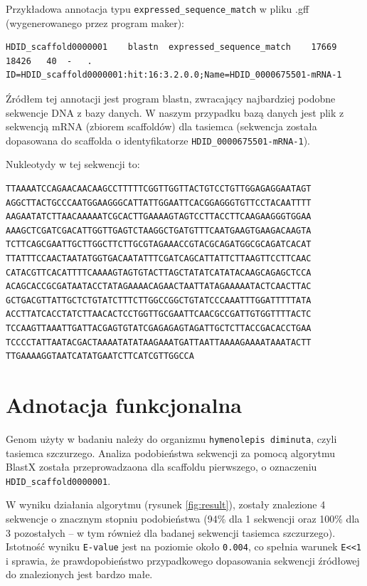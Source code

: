 \documentclass[a4paper]{article}
\begin{document}
Przykładowa annotacja typu \texttt{expressed\_sequence\_match} w pliku .gff (wygenerowanego przez program maker):
\begin{lstlisting}
HDID_scaffold0000001	blastn	expressed_sequence_match	17669	18426	40	-	.	ID=HDID_scaffold0000001:hit:16:3.2.0.0;Name=HDID_0000675501-mRNA-1
\end{lstlisting}

Źródłem tej annotacji jest program blastn, zwracający najbardziej podobne sekwencje DNA z bazy danych.
W naszym przypadku bazą danych jest plik z sekwencją mRNA (zbiorem scaffoldów) dla tasiemca
(sekwencja została dopasowana do scaffolda o identyfikatorze \texttt{HDID\_0000675501-mRNA-1}).


Nukleotydy w tej sekwencji to:

\begin{verbatim}
TTAAAATCCAGAACAACAAGCCTTTTTCGGTTGGTTACTGTCCTGTTGGAGAGGAATAGT
AGGCTTACTGCCCAATGGAAGGGCATTATTGGAATTCACGGAGGGTGTTCCTACAATTTT
AAGAATATCTTAACAAAAATCGCACTTGAAAAGTAGTCCTTACCTTCAAGAAGGGTGGAA
AAAGCTCGATCGACATTGGTTGAGTCTAAGGCTGATGTTTCAATGAAGTGAAGACAAGTA
TCTTCAGCGAATTGCTTGGCTTCTTGCGTAGAAACCGTACGCAGATGGCGCAGATCACAT
TTATTTCCAACTAATATGGTGACAATATTTCGATCAGCATTATTCTTAAGTTCCTTCAAC
CATACGTTCACATTTTCAAAAGTAGTGTACTTAGCTATATCATATACAAGCAGAGCTCCA
ACAGCACCGCGATAATACCTATAGAAAACAGAACTAATTATAGAAAAATACTCAACTTAC
GCTGACGTTATTGCTCTGTATCTTTCTTGGCCGGCTGTATCCCAAATTTGGATTTTTATA
ACCTTATCACCTATCTTAACACTCCTGGTTGCGAATTCAACGCCGATTGTGGTTTTACTC
TCCAAGTTAAATTGATTACGAGTGTATCGAGAGAGTAGATTGCTCTTACCGACACCTGAA
TCCCCTATTAATACGACTAAAATATATAAGAAATGATTAATTAAAAGAAAATAAATACTT
TTGAAAAGGTAATCATATGAATCTTCATCGTTGGCCA
\end{verbatim}


\section{Adnotacja funkcjonalna}
Genom użyty w badaniu należy do organizmu \texttt{hymenolepis diminuta}, czyli tasiemca szczurzego.
Analiza podobieństwa sekwencji za pomocą algorytmu BlastX została przeprowadzaona dla scaffoldu pierwszego,
o oznaczeniu \texttt{HDID\_scaffold0000001}.

W wyniku działania algorytmu (rysunek \ref{fig:result}), zostały znalezione 4 sekwencje o znacznym stopniu podobieństwa
(94\% dla 1 sekwencji oraz 100\% dla 3 pozostałych -- w tym również dla badanej sekwencji tasiemca szczurzego).
Istotność wyniku \texttt{E-value} jest na poziomie około \texttt{0.004},
co spełnia warunek \texttt{E<<1} i sprawia, że prawdopobieństwo przypadkowego dopasowania
sekwencji źródłowej do znalezionych jest bardzo małe.
\end{document}
